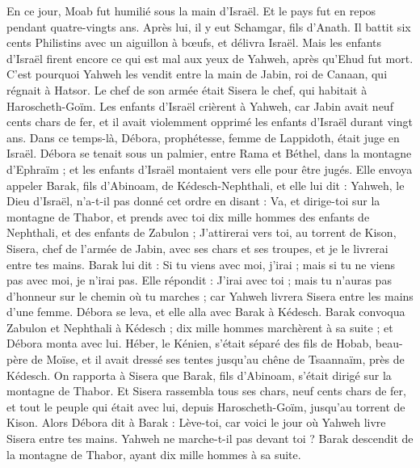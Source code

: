 \begin{multicols}{2}
En ce jour, Moab fut humilié sous la main d'Israël. Et le pays fut en repos pendant quatre-vingts ans.
Après lui, il y eut  Schamgar, fils d'Anath. Il battit six cents Philistins avec un aiguillon à bœufs, et délivra Israël.
\VerseOne{}Mais les enfants d'Israël firent encore ce qui est mal aux yeux de Yahweh, après qu'Ehud fut mort.
C'est pourquoi Yahweh les vendit entre la main de Jabin, roi de Canaan, qui régnait à Hatsor. Le chef de son armée était Sisera le chef, qui habitait à Haroscheth-Goïm.
Les enfants d'Israël crièrent à Yahweh, car Jabin avait neuf cents chars de fer, et il avait violemment opprimé les enfants d'Israël durant vingt ans.
Dans ce temps-là, Débora, prophétesse, femme de Lappidoth, était juge en Israël.
Débora se tenait sous un palmier, entre Rama et Béthel, dans la montagne d'Ephraïm ; et les enfants d'Israël montaient vers elle pour être jugés.
Elle envoya appeler Barak, fils d'Abinoam, de Kédesch-Nephthali, et elle lui dit : Yahweh, le Dieu d'Israël, n'a-t-il pas donné cet ordre en disant : Va, et dirige-toi sur la montagne de Thabor, et prends avec toi dix mille hommes des enfants de Nephthali, et des enfants de Zabulon ;
J’attirerai vers toi, au torrent de Kison, Sisera, chef de l'armée de Jabin, avec ses chars et ses troupes, et je le livrerai entre tes mains.
Barak lui dit : Si tu viens avec moi, j'irai ; mais si tu ne viens pas avec moi, je n’irai pas.
Elle répondit : J’irai avec toi ; mais tu n'auras pas d'honneur sur le chemin où tu marches ; car Yahweh livrera Sisera entre les mains d'une femme. Débora se leva, et elle alla avec Barak à Kédesch.
Barak convoqua Zabulon et Nephthali à Kédesch ; dix mille hommes marchèrent à sa suite ; et Débora monta avec lui.
Héber, le Kénien, s’était séparé des fils de Hobab, beau-père de Moïse, et il avait dressé ses tentes jusqu'au chêne de Tsaannaïm, près de Kédesch.
On rapporta à Sisera que Barak, fils d'Abinoam, s’était dirigé sur la montagne de Thabor.
Et Sisera rassembla tous ses chars, neuf cents chars de fer, et tout le peuple qui était avec lui, depuis Haroscheth-Goïm, jusqu'au torrent de Kison.
Alors Débora dit à Barak : Lève-toi, car voici le jour où Yahweh livre Sisera entre tes mains. Yahweh ne marche-t-il pas devant toi ? Barak descendit de la montagne de Thabor, ayant dix mille hommes à sa suite.

\end{multicols}
